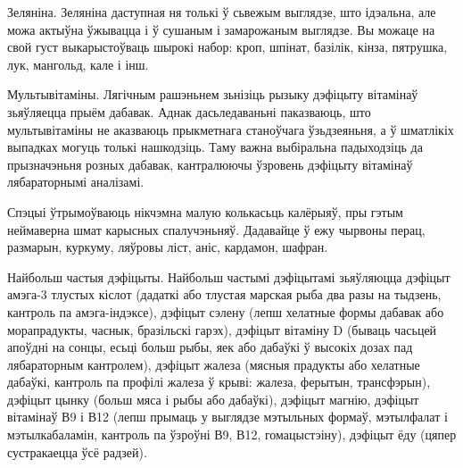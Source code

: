 Зеляніна.
Зеляніна даступная ня толькі ў сьвежым выглядзе, што ідэальна, але можа актыўна ўжывацца і ў сушаным і замарожаным выглядзе. Вы можаце на свой густ выкарыстоўваць шырокі набор: кроп, шпінат, базілік, кінза, пятрушка, лук, мангольд, кале і інш.

Мультывітаміны.
Лягічным рашэньнем зьнізіць рызыку дэфіцыту вітамінаў зьяўляецца прыём дабавак. Аднак дасьледаваньні паказваюць, што мультывітаміны не аказваюць прыкметнага станоўчага ўзьдзеяньня, а ў шматлікіх выпадках могуць толькі нашкодзіць. Таму важна выбіральна падыходзіць да прызначэньня розных дабавак, кантралюючы ўзровень дэфіцыту вітамінаў лябараторнымі аналізамі.

Спэцыі ўтрымоўваюць нікчэмна малую колькасьць калёрыяў, пры гэтым неймаверна шмат карысных спалучэньняў. Дадавайце ў ежу чырвоны перац, размарын, куркуму, ляўровы ліст, аніс, кардамон, шафран.

Найбольш частыя дэфіцыты.
Найбольш частымі дэфіцытамі зьяўляюцца дэфіцыт амэга-3 тлустых кіслот (дадаткі або тлустая марская рыба два разы на тыдзень, кантроль па амэга-індэксе), дэфіцыт сэлену (лепш хелатные формы дабавак або морапрадукты, часнык, бразільскі гарэх), дэфіцыт вітаміну D (бываць часьцей апоўдні на сонцы, есьці больш рыбы, яек або дабаўкі ў высокіх дозах пад лябараторным кантролем), дэфіцыт жалеза (мясныя прадукты або хелатные дабаўкі, кантроль па профілі жалеза ў крыві: жалеза, ферытын, трансфэрын), дэфіцыт цынку (больш мяса і рыбы або дабаўкі), дэфіцыт магнію, дэфіцыт вітамінаў В9 і В12 (лепш прымаць у выглядзе мэтыльных формаў, мэтылфалат і мэтылкабаламін, кантроль па ўзроўні В9, В12, гомацыстэіну), дэфіцыт ёду (цяпер сустракаецца ўсё радзей).
